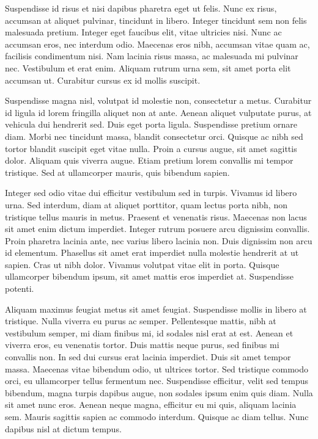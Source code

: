 Suspendisse id risus et nisi dapibus pharetra eget ut felis. Nunc ex risus, accumsan at aliquet pulvinar, tincidunt in libero. Integer tincidunt sem non felis malesuada pretium. Integer eget faucibus elit, vitae ultricies nisi. Nunc ac accumsan eros, nec interdum odio. Maecenas eros nibh, accumsan vitae quam ac, facilisis condimentum nisi. Nam lacinia risus massa, ac malesuada mi pulvinar nec. Vestibulum et erat enim. Aliquam rutrum urna sem, sit amet porta elit accumsan ut. Curabitur cursus ex id mollis suscipit.

Suspendisse magna nisl, volutpat id molestie non, consectetur a metus. Curabitur id ligula id lorem fringilla aliquet non at ante. Aenean aliquet vulputate purus, at vehicula dui hendrerit sed. Duis eget porta ligula. Suspendisse pretium ornare diam. Morbi nec tincidunt massa, blandit consectetur orci. Quisque ac nibh sed tortor blandit suscipit eget vitae nulla. Proin a cursus augue, sit amet sagittis dolor. Aliquam quis viverra augue. Etiam pretium lorem convallis mi tempor tristique. Sed at ullamcorper mauris, quis bibendum sapien.

Integer sed odio vitae dui efficitur vestibulum sed in turpis. Vivamus id libero urna. Sed interdum, diam at aliquet porttitor, quam lectus porta nibh, non tristique tellus mauris in metus. Praesent et venenatis risus. Maecenas non lacus sit amet enim dictum imperdiet. Integer rutrum posuere arcu dignissim convallis. Proin pharetra lacinia ante, nec varius libero lacinia non. Duis dignissim non arcu id elementum. Phasellus sit amet erat imperdiet nulla molestie hendrerit at ut sapien. Cras ut nibh dolor. Vivamus volutpat vitae elit in porta. Quisque ullamcorper bibendum ipsum, sit amet mattis eros imperdiet at. Suspendisse potenti.

Aliquam maximus feugiat metus sit amet feugiat. Suspendisse mollis in libero at tristique. Nulla viverra eu purus ac semper. Pellentesque mattis, nibh at vestibulum semper, mi diam finibus mi, id sodales nisl erat at est. Aenean et viverra eros, eu venenatis tortor. Duis mattis neque purus, sed finibus mi convallis non. In sed dui cursus erat lacinia imperdiet. Duis sit amet tempor massa. Maecenas vitae bibendum odio, ut ultrices tortor. Sed tristique commodo orci, eu ullamcorper tellus fermentum nec. Suspendisse efficitur, velit sed tempus bibendum, magna turpis dapibus augue, non sodales ipsum enim quis diam. Nulla sit amet nunc eros. Aenean neque magna, efficitur eu mi quis, aliquam lacinia sem. Mauris sagittis sapien ac commodo interdum. Quisque ac diam tellus. Nunc dapibus nisl at dictum tempus.

